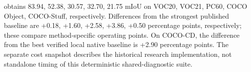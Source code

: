\method{} obtains 83.94, 52.38, 30.57, 32.70, 21.75 mIoU on VOC20, VOC21, PC60, COCO Object, COCO-Stuff, respectively. Differences from the strongest published baseline are +0.18, +1.60, +2.58, +3.86, +0.50 percentage points, respectively; these compare method-specific operating points. On COCO-CD, the difference from the best verified local native baseline is +2.90 percentage points. The separate cost snapshot describes the historical research implementation, not standalone timing of this deterministic shared-diagnostic suite.
